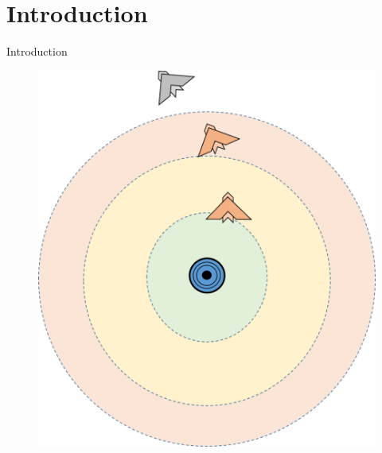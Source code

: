 \section{Introduction}

\begin{frame}{Introduction}{}
\begin{figure}[H]
\centerline{
\includegraphics[scale=0.35]{figures/intro.png}}
\label{fig:intro}
\end{figure}
\end{frame}

